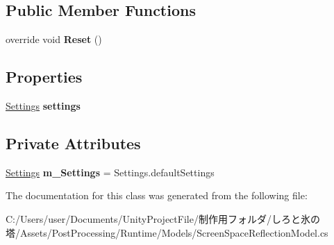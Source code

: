 \subsection*{Public Member Functions}
\begin{DoxyCompactItemize}
\item 
\mbox{\label{class_unity_engine_1_1_post_processing_1_1_screen_space_reflection_model_abf314aab69e370e9f092e17e69a57066}} 
override void {\bfseries Reset} ()
\end{DoxyCompactItemize}
\subsection*{Properties}
\begin{DoxyCompactItemize}
\item 
\mbox{\label{class_unity_engine_1_1_post_processing_1_1_screen_space_reflection_model_a8d261a46d42d443edb5cc23d9e8bdfb7}} 
\hyperlink{struct_unity_engine_1_1_post_processing_1_1_screen_space_reflection_model_1_1_settings}{Settings} {\bfseries settings}
\end{DoxyCompactItemize}
\subsection*{Private Attributes}
\begin{DoxyCompactItemize}
\item 
\mbox{\label{class_unity_engine_1_1_post_processing_1_1_screen_space_reflection_model_a31c4b09e154d67065e8ddfc45e6589b1}} 
\hyperlink{struct_unity_engine_1_1_post_processing_1_1_screen_space_reflection_model_1_1_settings}{Settings} {\bfseries m\+\_\+\+Settings} = Settings.\+default\+Settings
\end{DoxyCompactItemize}


The documentation for this class was generated from the following file\+:\begin{DoxyCompactItemize}
\item 
C\+:/\+Users/user/\+Documents/\+Unity\+Project\+File/制作用フォルダ/しろと氷の塔/\+Assets/\+Post\+Processing/\+Runtime/\+Models/Screen\+Space\+Reflection\+Model.\+cs\end{DoxyCompactItemize}
